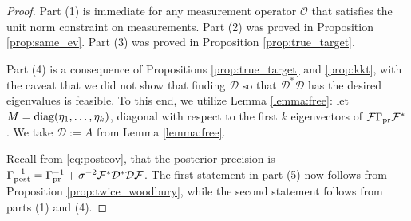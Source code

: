 \documentclass[ba]{imsart}
\newcommand{\diag}{\textup{diag}}
\newcommand{\obs}{\mathcal{O}}
\newcommand{\fwd}{\mathcal{F}}
\newcommand{\opt}{\mathcal{D}}
\theoremstyle{plain}
\theoremstyle{definition}
\theoremstyle{remark}
\begin{document}
\begin{proof}
  Part (1) is immediate for any measurement operator $\obs$ that
  satisfies the unit norm constraint on measurements. Part (2)
  was proved in Proposition \ref{prop:same_ev}. Part (3) was proved in
  Proposition \ref{prop:true_target}.
  
  Part (4) is a consequence of Propositions \ref{prop:true_target} and
  \ref{prop:kkt}, with the caveat that we did not show that finding
  $\opt$ so that $\opt^*\opt$ has the desired eigenvalues is
  feasible. To this end, we utilize Lemma \ref{lemma:free}: let $M =
  \diag(\eta_1, \dots, \eta_k)$, diagonal with respect to the first
  $k$ eigenvectors of $\fwd \prcov \fwd^*$. We take $\opt := A$ from
  Lemma \ref{lemma:free}.
  
  Recall from \eqref{eq:postcov}, that the posterior precision is
  $\postcov^{-1} = \prcov^{-1} + \sigma^{-2}\fwd^*\opt^*\opt\fwd$. The
  first statement in part (5) now follows from Proposition
  \ref{prop:twice_woodbury}, while the second statement follows from
  parts (1) and (4).
\end{proof}


\optimalvsnot
\end{document}
